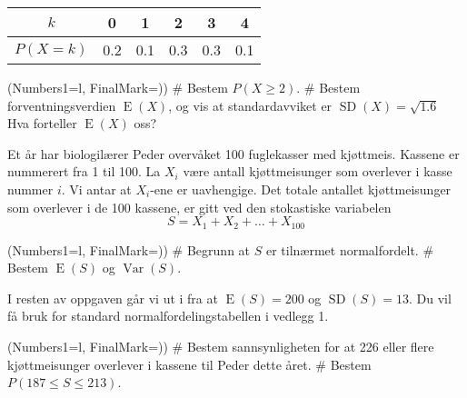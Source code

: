 \documentclass[12pt, a4paper]{article}
\begin{document}
\begin{center}
	\begin{tabular}{|c|c|c|c|c|c|}
		\hline
		$k$ & 0 & 1 & 2 & 3 & 4 \\ \hline
		$P(X = k)$ & 0.2 & 0.1 & 0.3 & 0.3 & 0.1 \\ \hline
	\end{tabular}
\end{center}
\begin{easylist}[enumerate]
	\ListProperties(Numbers1=l, FinalMark={)})
	# Bestem $P(X \geq 2)$.
	# Bestem forventningsverdien $\operatorname{E}(X)$,
	og vis at standardavviket er $\operatorname{SD}(X) = \sqrt{1.6}$\\
	Hva forteller $\operatorname{E}(X)$ oss?
\end{easylist}

Et år har biologilærer Peder overvåket 100 
fuglekasser med kjøttmeis. Kassene er nummerert fra 1 til
100. La $X_i$ være antall kjøttmeisunger som overlever i kasse
nummer $i$. Vi antar at $X_i$-ene er uavhengige. 
Det totale antallet kjøttmeisunger som overlever i de 100
kassene, er gitt ved den stokastiske variabelen
\begin{equation*}
	S = X_1 + X_2 + \dots + X_{100}
\end{equation*}

\begin{easylist}
	\ListProperties(Numbers1=l, FinalMark={)})
	# Begrunn at $S$ er tilnærmet normalfordelt.
	# Bestem $\operatorname{E}(S)$ og $\operatorname{Var}(S)$.
\end{easylist}

I resten av oppgaven går vi ut i fra at 
$\operatorname{E}(S) = 200$ og 
$\operatorname{SD}(S) = 13$.
Du vil få bruk for standard normalfordelingstabellen i vedlegg 1.

\begin{easylist}
	\ListProperties(Numbers1=l, FinalMark={)})
	# Bestem sannsynligheten for at 226 eller flere kjøttmeisunger
	overlever i kassene til Peder dette året.
	# Bestem $P(187 \leq S \leq 213)$.
\end{easylist}
\pagebreak
\end{document}
